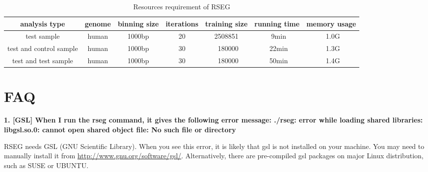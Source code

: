 \documentclass[11pt]{report}
\begin{document}
 
\begin{table}[th]
  \centering
  \begin{tabular}{c c c c c c c }
    \hline
    analysis type & genome & binning size & iterations & training size
    & running time & memory usage\\
    \hline
    test sample & human & 1000bp & 20 & 2508851 & ~9min & ~1.0G \\
    test and control sample & human & 1000bp & 30 & ~180000 & ~22min & ~1.3G \\
    test and test sample & human & 1000bp & 30 & ~180000 & ~50min &
    ~1.4G \\
   \hline
  \end{tabular}
  \caption{Resources requirement of RSEG}
  \label{tab:format-bin-diff}
\end{table}

\section{FAQ}
\label{sec:faq}

\textbf{1. [GSL] 
When I run the rseg command, it gives  the following error message: ./rseg:
error while loading shared libraries: libgsl.so.0: cannot open  shared object
file: No such file or directory}


RSEG needs GSL (GNU Scientific Library).  When you see this error, it is likely
that gsl is not installed on your machine. You may need to manually install it
from \url{http://www.gnu.org/software/gsl/}. Alternatively, there are
pre-compiled gsl packages on major Linux distribution, such as SUSE or UBUNTU.
\end{document}
